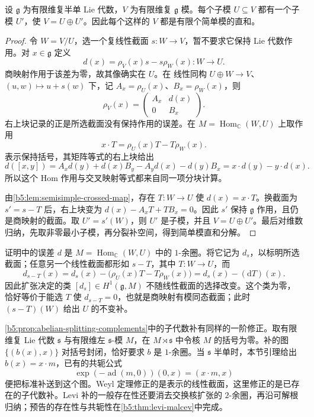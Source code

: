 \begin{theorem}\label{b5:thm:weyl-complete-reducibility}
	设 \(\mathfrak g\) 为有限维复半单 Lie 代数，\(V\) 为有限维复 \(\mathfrak g\) 模。每个子模 \(U\subseteq V\) 都有一个子模 \(U'\)，使 \(V=U\oplus U'\)。因此每个这样的 \(V\) 都是有限个简单模的直和。
\end{theorem}
\begin{proof}
	令 \(W=V/U\)，选一个复线性截面 \(s:W\to V\)，暂不要求它保持 Lie 代数作用。对 \(x\in\mathfrak g\) 定义
	\[
		d(x)=\rho_V(x)s-s\rho_W(x):W\longrightarrow U.
	\]
	商映射作用于该差为零，故其像确实在 \(U\)。在 线性同构 \(U\oplus W\to V\)、\((u,w)\mapsto u+s(w)\) 下，记 \(A_x=\rho_U(x)\)、\(B_x=\rho_W(x)\)，则
	\[
		\rho_V(x)=\begin{pmatrix}A_x&d(x)\\0&B_x\end{pmatrix}.
	\]
	右上块记录的正是所选截面没有保持作用的误差。在 \(M=\operatorname{Hom}_{\mathbb C}(W,U)\) 上取作用
	\[
		x\cdot T=\rho_U(x)T-T\rho_W(x).
	\]
	表示保持括号，其矩阵等式的右上块给出
	\[
		d([x,y])=A_xd(y)+d(x)B_y-A_yd(x)-d(y)B_x =x\cdot d(y)-y\cdot d(x).
	\]
	所以这个 Hom 作用与交叉映射等式都来自同一项分块计算。

	由\cref{b5:lem:semisimple-crossed-map}，存在 \(T:W\to U\) 使 \(d(x)=x\cdot T\)。换截面为 \(s'=s-T\) 后，右上块变为 \(d(x)-A_xT+TB_x=0\)。因此 \(s'\) 保持 \(\mathfrak g\) 作用，且仍是商映射的截面。取 \(U'=s'(W)\)，则 \(U'\) 是子模，并且 \(V=U\oplus U'\)。最后对维数归纳，先取非零最小子模，再分裂补空间，得到简单模直和分解。
\end{proof}

证明中的误差 \(d\) 是 \(M=\operatorname{Hom}_{\mathbb C}(W,U)\) 中的 \(1\)-余圈。将它记为 \(d_s\)，以标明所选截面；任意另一个线性截面都形如 \(s-T\)，其中 \(T:W\rightarrow U\)，而
\[
	d_{s-T}(x)=d_s(x)-\bigl(\rho_U(x)T-T\rho_W(x)\bigr) =d_s(x)-(\mathrm{d}T)(x).
\]
因此扩张决定的类 \([d_s]\in H^1(\mathfrak g,M)\) 不随线性截面的选择改变。这个类为零，恰好等价于能选 \(T\) 使 \(d_{s-T}=0\)，也就是商映射有模同态截面；此时 \((s-T)(W)\) 给出 \(U\) 的不变补。

\ProseParagraphBreak

\cref{b5:prop:abelian-splitting-complements}中的子代数补有同样的一阶修正。取有限维复 Lie 代数 \(\mathfrak s\) 与有限维左 \(\mathfrak s\)-模 \(M\)，在 \(M\rtimes\mathfrak s\) 中令核 \(M\) 的括号为零。补的图 \(\{(b(x),x)\}\) 对括号封闭，恰好要求 \(b\) 是 \(1\)-余圈。当 \(\mathfrak s\) 半单时，本节引理给出 \(b(x)=x\cdot m\)，已有的共轭公式
\[
	\exp(-\operatorname{ad}(m,0))(0,x)=(x\cdot m,x)
\]
便把标准补送到这个图。Weyl 定理修正的是表示的线性截面，这里修正的是已存在的子代数补。Levi 补的一般存在性还要消去交换核扩张的 \(2\)-余圈，再沿可解根归纳；预告的存在性与共轭性在\cref{b5:thm:levi-malcev}中完成。


